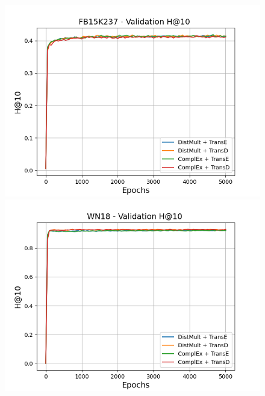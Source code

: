 \begin{figure}
    \begin{minipage}{.3\textwidth}
      \centering
      \includegraphics[width=\linewidth]{figures/results/gan_train/not_pretrained/uncertainty/max_distribution/entropy/fb15k237/5k_epochs/uncertainty_fb15k237_hit10.png}
    \end{minipage}%
     \begin{minipage}{.3\textwidth}
      \centering
      \includegraphics[width=0.9\linewidth]{figures/results/gan_train/not_pretrained/uncertainty/max_distribution/entropy/wn18/5k_epochs/uncertainty_wn18_hit10.png}
    \end{minipage}%
     \begin{minipage}{.3\textwidth}
      \centering

\end{minipage}
\end{figure}
